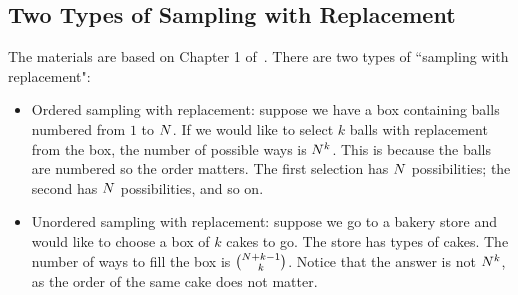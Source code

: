 

\subsection{Two Types of Sampling with Replacement}
The materials are based on Chapter 1 of~\cite{degroot2012probability}.
There are two types of ``sampling with replacement":
\begin{itemize}
    \item Ordered sampling with replacement: suppose we have a box containing \ndata balls numbered from $1$ to $N$.
    If we would like to select $k$ balls with replacement from the box, the number of possible ways is $N^k$.
    This is because the balls are numbered so the order matters. The first selection has $N$ possibilities; the second has $N$ possibilities, and so on.
    
    \item Unordered sampling with replacement: suppose we go to a bakery store and would like to choose a box of $k$ cakes to go.
    The store has \ndata types of cakes.
    The number of ways to fill the box is $\binom{N+k-1}{k}$.
    Notice that the answer is not $N^k$, as the order of the same cake does not matter.
\end{itemize}